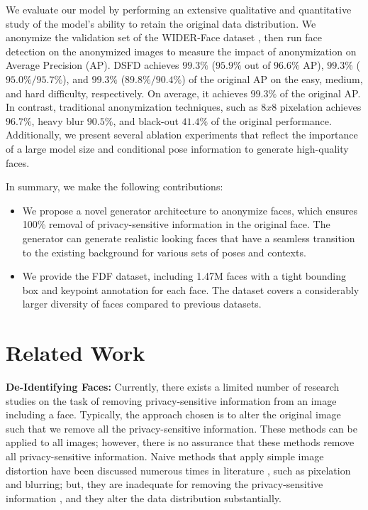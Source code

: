 \documentclass[runningheads]{llncs}
\begin{document}
We evaluate our model by performing an extensive qualitative and quantitative study of the model's  ability to retain the original data distribution. 
We anonymize the validation set of the WIDER-Face dataset \cite{yang2016wider}, then run face detection on the anonymized images to measure the impact of anonymization on Average Precision (AP). 
DSFD \cite{li2018dsfd} achieves $99.3\%$ ($95.9\%$ out of $96.6\%$ AP), $99.3\%$ ($95.0\%/95.7\%$), and $99.3\%$ ($89.8\%/90.4\%$) of the original AP on the easy, medium, and hard difficulty, respectively.
On average, it achieves $99.3\%$ of the original AP.
In contrast, traditional anonymization techniques, such as $8x8$ pixelation achieves $96.7\%$, heavy blur $90.5\%$, and black-out $41.4\%$ of the original performance.
Additionally, we present several ablation experiments that reflect the importance of a large model size and conditional pose information to generate high-quality faces.

In summary, we make the following contributions:
\begin{itemize}

    \item We propose a novel generator architecture to anonymize faces, which ensures 100\% removal of privacy-sensitive information in the original face. The generator can generate realistic looking faces that have a seamless transition to the existing background for various sets of poses and contexts.
    \item We provide the FDF dataset, including 1.47M faces with a tight bounding box and keypoint annotation for each face. The dataset covers a considerably larger diversity of faces compared to previous datasets.
    


\end{itemize}

 \section{Related Work}


\textbf{De-Identifying Faces:}
Currently, there exists a limited number of  research studies on the task of removing privacy-sensitive information from an image including a face. 
Typically, the approach chosen is to alter the original image such that we remove all the privacy-sensitive information. 
These methods can be applied to all images; however, there is no assurance that these methods remove all privacy-sensitive information. 
Naive methods that apply simple image distortion have been discussed numerous times in literature \cite{Boyle2000ThePrivacy,Neustaedter2006BlurConferencing,Gross2009FaceDe-identification,Newton2005,Gross2006Model-basedDe-identification}, such as pixelation and blurring; but, they are inadequate for removing the privacy-sensitive information \cite{Gross2006Model-basedDe-identification,Neustaedter2006BlurConferencing,Newton2005}, and they alter the data distribution substantially.
\end{document}
